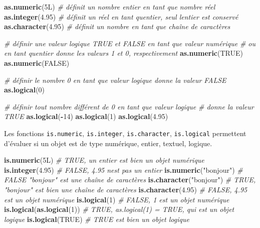 \documentclass[
]{book}
\newenvironment{Shaded}{\begin{snugshade}}{\end{snugshade}}
\newcommand{\CommentTok}[1]{\textcolor[rgb]{0.56,0.35,0.01}{\textit{#1}}}
\newcommand{\ConstantTok}[1]{\textcolor[rgb]{0.56,0.35,0.01}{#1}}
\newcommand{\DataTypeTok}[1]{\textcolor[rgb]{0.13,0.29,0.53}{#1}}
\newcommand{\DecValTok}[1]{\textcolor[rgb]{0.00,0.00,0.81}{#1}}
\newcommand{\FloatTok}[1]{\textcolor[rgb]{0.00,0.00,0.81}{#1}}
\newcommand{\FunctionTok}[1]{\textcolor[rgb]{0.13,0.29,0.53}{\textbf{#1}}}
\newcommand{\NormalTok}[1]{#1}
\newcommand{\SpecialCharTok}[1]{\textcolor[rgb]{0.81,0.36,0.00}{\textbf{#1}}}
\newcommand{\StringTok}[1]{\textcolor[rgb]{0.31,0.60,0.02}{#1}}
\begin{document}
\begin{Shaded}
\begin{Highlighting}[]
\FunctionTok{as.numeric}\NormalTok{(}\DecValTok{5}\DataTypeTok{L}\NormalTok{) }\CommentTok{\# définit un nombre entier en tant que nombre réel}
\FunctionTok{as.integer}\NormalTok{(}\FloatTok{4.95}\NormalTok{) }\CommentTok{\# définit un réel en tant qu\textquotesingle{}entier, seul l\textquotesingle{}entier est conservé}
\FunctionTok{as.character}\NormalTok{(}\FloatTok{4.95}\NormalTok{) }\CommentTok{\# définit un nombre en tant que chaîne de caractères}

\CommentTok{\# définir une valeur logique TRUE et FALSE en tant que valeur numérique }
\CommentTok{\# ou en tant qu\textquotesingle{}entier donne les valeurs 1 et 0, respectivement}
\FunctionTok{as.numeric}\NormalTok{(}\ConstantTok{TRUE}\NormalTok{) }
\FunctionTok{as.numeric}\NormalTok{(}\ConstantTok{FALSE}\NormalTok{) }

\CommentTok{\# définir le nombre 0 en tant que valeur logique donne la valeur FALSE}
\FunctionTok{as.logical}\NormalTok{(}\DecValTok{0}\NormalTok{)}

\CommentTok{\# définir tout nombre différent de 0 en tant que valeur logique }
\CommentTok{\# donne la valeur TRUE}
\FunctionTok{as.logical}\NormalTok{(}\SpecialCharTok{{-}}\DecValTok{14}\NormalTok{)}
\FunctionTok{as.logical}\NormalTok{(}\DecValTok{1}\NormalTok{)}
\FunctionTok{as.logical}\NormalTok{(}\FloatTok{4.95}\NormalTok{)}
\end{Highlighting}
\end{Shaded}

Les fonctions \texttt{is.numeric}, \texttt{is.integer}, \texttt{is.character}, \texttt{is.logical} permettent d'évaluer si un objet est de type numérique, entier, textuel, logique.

\begin{Shaded}
\begin{Highlighting}[]
\FunctionTok{is.numeric}\NormalTok{(}\DecValTok{5}\DataTypeTok{L}\NormalTok{) }\CommentTok{\# TRUE, un entier est bien un objet numérique}
\FunctionTok{is.integer}\NormalTok{(}\FloatTok{4.95}\NormalTok{) }\CommentTok{\# FALSE, 4.95 n\textquotesingle{}est pas un entier}
\FunctionTok{is.numeric}\NormalTok{(}\StringTok{"bonjour"}\NormalTok{) }\CommentTok{\# FALSE "bonjour" est une chaîne de caractères}
\FunctionTok{is.character}\NormalTok{(}\StringTok{"bonjour"}\NormalTok{) }\CommentTok{\# TRUE, "bonjour" est bien une chaîne de caractères}
\FunctionTok{is.character}\NormalTok{(}\FloatTok{4.95}\NormalTok{) }\CommentTok{\# FALSE, 4.95 est un objet numérique}
\FunctionTok{is.logical}\NormalTok{(}\DecValTok{1}\NormalTok{) }\CommentTok{\# FALSE, 1 est un objet numérique}
\FunctionTok{is.logical}\NormalTok{(}\FunctionTok{as.logical}\NormalTok{(}\DecValTok{1}\NormalTok{)) }\CommentTok{\# TRUE, as.logical(1) = TRUE, qui est un objet logique}
\FunctionTok{is.logical}\NormalTok{(}\ConstantTok{TRUE}\NormalTok{) }\CommentTok{\# TRUE est bien un objet logique}
\end{Highlighting}
\end{Shaded}
\end{document}
